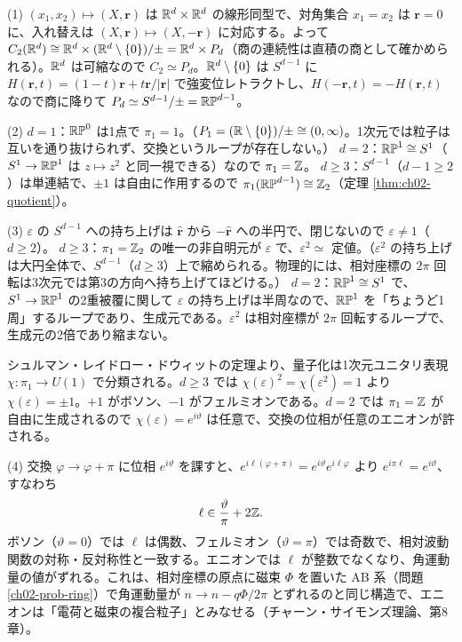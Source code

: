 \begin{solution}
(1) $(x_1,x_2)\mapsto(X,\bm r)$ は $\mathbb{R}^d\times\mathbb{R}^d$ の線形同型で、対角集合 $x_1=x_2$ は $\bm r=0$ に、入れ替えは $(X,\bm r)\mapsto(X,-\bm r)$ に対応する。よって $C_2(\mathbb{R}^d)\cong\mathbb{R}^d\times(\mathbb{R}^d\setminus\{0\})/\pm=\mathbb{R}^d\times P_d$（商の連続性は直積の商として確かめられる）。$\mathbb{R}^d$ は可縮なので $C_2\simeq P_d$。$\mathbb{R}^d\setminus\{0\}$ は $S^{d-1}$ に $H(\bm r,t)=(1-t)\bm r+t\bm r/\lvert\bm r\rvert$ で強変位レトラクトし、$H(-\bm r,t)=-H(\bm r,t)$ なので商に降りて $P_d\simeq S^{d-1}/\pm=\mathbb{RP}^{d-1}$。

(2) $d=1$：$\mathbb{RP}^0$ は1点で $\pi_1=1$。（$P_1=(\mathbb{R}\setminus\{0\})/\pm\cong(0,\infty)$。1次元では粒子は互いを通り抜けられず、交換というループが存在しない。）
$d=2$：$\mathbb{RP}^1\cong S^1$（$S^1\to\mathbb{RP}^1$ は $z\mapsto z^2$ と同一視できる）なので $\pi_1=\mathbb{Z}$。
$d\ge3$：$S^{d-1}$（$d-1\ge2$）は単連結で、$\pm1$ は自由に作用するので $\pi_1(\mathbb{RP}^{d-1})\cong\mathbb{Z}_2$（定理 \ref{thm:ch02-quotient}）。

(3) $\varepsilon$ の $S^{d-1}$ への持ち上げは $\hat{\bm r}$ から $-\hat{\bm r}$ への半円で、閉じないので $\varepsilon\ne1$（$d\ge2$）。
$d\ge3$：$\pi_1=\mathbb{Z}_2$ の唯一の非自明元が $\varepsilon$ で、$\varepsilon^2\simeq$ 定値。（$\varepsilon^2$ の持ち上げは大円全体で、$S^{d-1}$（$d\ge3$）上で縮められる。物理的には、相対座標の $2\pi$ 回転は3次元では第3の方向へ持ち上げてほどける。）
$d=2$：$\mathbb{RP}^1\cong S^1$ で、$S^1\to\mathbb{RP}^1$ の2重被覆に関して $\varepsilon$ の持ち上げは半周なので、$\mathbb{RP}^1$ を「ちょうど1周」するループであり、生成元である。$\varepsilon^2$ は相対座標が $2\pi$ 回転するループで、生成元の2倍であり縮まない。

シュルマン・レイドロー・ドウィットの定理より、量子化は1次元ユニタリ表現 $\chi\colon\pi_1\to U(1)$ で分類される。$d\ge3$ では $\chi(\varepsilon)^2=\chi(\varepsilon^2)=1$ より $\chi(\varepsilon)=\pm1$。$+1$ がボソン、$-1$ がフェルミオンである。$d=2$ では $\pi_1=\mathbb{Z}$ が自由に生成されるので $\chi(\varepsilon)=e^{i\vartheta}$ は任意で、交換の位相が任意のエニオンが許される。

(4) 交換 $\varphi\to\varphi+\pi$ に位相 $e^{i\vartheta}$ を課すと、$e^{i\ell(\varphi+\pi)}=e^{i\vartheta}e^{i\ell\varphi}$ より $e^{i\pi\ell}=e^{i\vartheta}$、すなわち
\[
\ell\in\frac{\vartheta}{\pi}+2\mathbb{Z} .
\]
ボソン（$\vartheta=0$）では $\ell$ は偶数、フェルミオン（$\vartheta=\pi$）では奇数で、相対波動関数の対称・反対称性と一致する。エニオンでは $\ell$ が整数でなくなり、角運動量の値がずれる。これは、相対座標の原点に磁束 $\Phi$ を置いた AB 系（問題 \ref{ch02-prob-ring}）で角運動量が $n\to n-q\Phi/2\pi$ とずれるのと同じ構造で、エニオンは「電荷と磁束の複合粒子」とみなせる（チャーン・サイモンズ理論、第8章）。
\end{solution}

